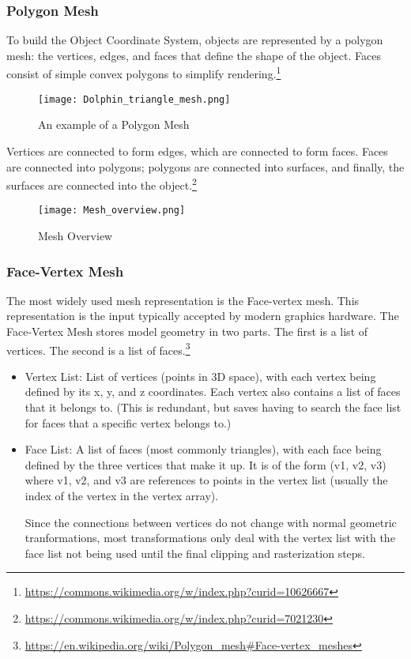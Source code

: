 \documentclass{article}
\begin{document}
\subsubsection{Polygon Mesh}
To build the Object Coordinate System, objects are represented by a polygon mesh: the vertices, edges, and faces that define the shape of the object. Faces consist of simple convex polygons to simplify rendering.\footnote{\url{https://commons.wikimedia.org/w/index.php?curid=10626667}}

\begin{figure}[H]
    \centering
    \texttt{[image: Dolphin\_triangle\_mesh.png]}
    \caption{An example of a Polygon Mesh}
    \label{dolphin}
\end{figure}

Vertices are connected to form edges, which are connected to form faces. Faces are connected into polygons; polygons are connected into surfaces, and finally, the surfaces are connected into the object.\footnote{\url{https://commons.wikimedia.org/w/index.php?curid=7021230}}

\begin{figure}[H]
    \centering
    \texttt{[image: Mesh\_overview.png]}
    \caption{Mesh Overview}
    \label{meshOverview}
\end{figure}

\subsubsection{Face-Vertex Mesh}
The most widely used mesh representation is the Face-vertex mesh. This representation is the input typically accepted by modern graphics hardware. The Face-Vertex Mesh stores model geometry in two parts. The first is a list of vertices. The second is a list of faces.\footnote{\url{https://en.wikipedia.org/wiki/Polygon_mesh\#Face-vertex_meshes}}

\begin{itemize}
\item{Vertex List:
List of vertices (points in 3D space), with each vertex being defined by its x, y, and z coordinates. Each vertex also contains a list of faces that it belongs to. (This is redundant, but saves having to search the face list for faces that a specific vertex belongs to.)}

\item{Face List:
A list of faces (most commonly triangles), with each face being defined by the three vertices that make it up. It is of the form (v1, v2, v3) where v1, v2, and v3 are references to points in the vertex list (usually the index of the vertex in the vertex array).

Since the connections between vertices do not change with normal geometric tranformations, most transformations only deal with the vertex list with the face list not being used until the final clipping and rasterization steps.}
\end{itemize}
\end{document}
